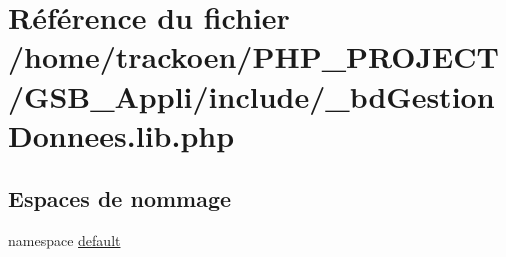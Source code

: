 \hypertarget{__bd_gestion_donnees_8lib_8php}{\section{Référence du fichier /home/trackoen/\-P\-H\-P\-\_\-\-P\-R\-O\-J\-E\-C\-T/\-G\-S\-B\-\_\-\-Appli/include/\-\_\-bd\-Gestion\-Donnees.lib.\-php}
\label{__bd_gestion_donnees_8lib_8php}
}
\subsection*{Espaces de nommage}
\begin{DoxyCompactItemize}
\item 
namespace \hyperlink{namespacedefault}{default}
\end{DoxyCompactItemize}
